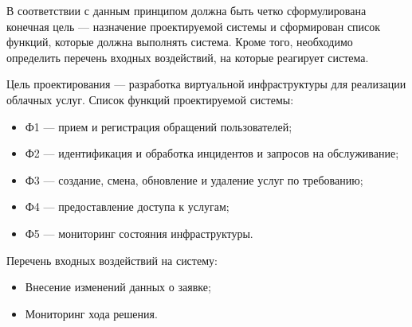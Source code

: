 В соответствии с данным принципом должна быть четко сформулирована конечная цель --- назначение проектируемой системы и сформирован список функций, которые должна выполнять система.
Кроме того, необходимо определить перечень входных воздействий, на которые реагирует система.

Цель проектирования --- разработка виртуальной инфраструктуры для реализации облачных услуг.
Список функций проектируемой системы:
\begin{itemize}
  \item Ф1 --- прием и регистрация обращений пользователей;
  \item Ф2 --- идентификация и обработка инцидентов и запросов на обслуживание;
  \item Ф3 --- создание, смена, обновление и удаление услуг по требованию;
  \item Ф4 --- предоставление доступа к услугам;
  \item Ф5 --- мониторинг состояния инфраструктуры.
\end{itemize}

Перечень входных воздействий на систему:
\begin{itemize}
  \item Внесение изменений данных о заявке;
  \item Мониторинг хода решения.
\end{itemize}



\clearpage
